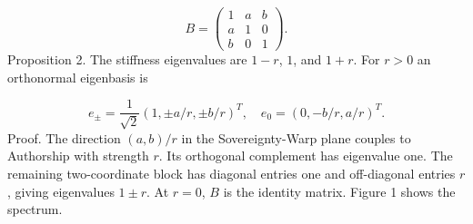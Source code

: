 \documentclass[aip,adv,preprint,floatfix]{revtex4-2}
\begin{document}
\begin{equation}
B=\begin{pmatrix}1&a&b\\a&1&0\\b&0&1\end{pmatrix}.
\end{equation}
Proposition 2. The stiffness eigenvalues are $1-r$, $1$, and $1+r$. For $r>0$ an orthonormal eigenbasis is

\begin{equation}
e_\pm=\frac1{\sqrt2}(1,\pm a/r,\pm b/r)^T,\quad e_0=(0,-b/r,a/r)^T.
\end{equation}
Proof. The direction $(a,b)/r$ in the Sovereignty-Warp plane couples to Authorship with strength $r$. Its orthogonal complement has eigenvalue one. The remaining two-coordinate block has diagonal entries one and off-diagonal entries $r$, giving eigenvalues $1\pm r$. At $r=0$, $B$ is the identity matrix. Figure 1 shows the spectrum.
\end{document}
